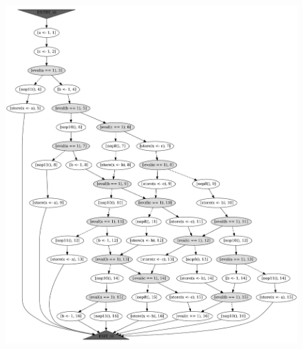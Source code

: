 \begin{figure}[!h]
%
\begin{minipage}{.6\textwidth}
  \includegraphics[height=.6\textheight,width=\textwidth]{img/my/graphs/unrolling-comparison/PorthosC/t0_unrolled.png}
\end{minipage}
%
\begin{minipage}{.39\textwidth}

\end{minipage}
\end{figure}
